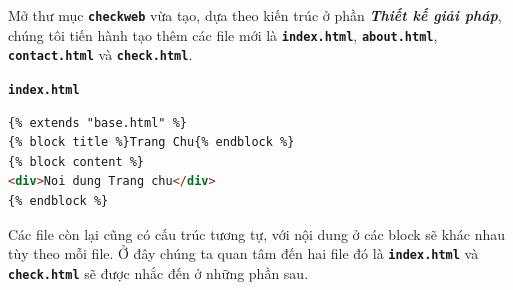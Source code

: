 \par
Mở thư mục \textbf{\texttt{checkweb}} vừa tạo, dựa theo kiến trúc ở phần \textbf{\textit{Thiết kế giải pháp}}, chúng tôi tiến hành tạo thêm các file mới là \textbf{\texttt{index.html}}, \textbf{\texttt{about.html}}, \textbf{\texttt{contact.html}} và \textbf{\texttt{check.html}}.
\par
\textbf{\texttt{index.html}}
\begin{lstlisting}[language=html]
{% extends "base.html" %}
{% block title %}Trang Chu{% endblock %}
{% block content %}
<div>Noi dung Trang chu</div>
{% endblock %}
\end{lstlisting}
\par
Các file còn lại cũng có cấu trúc tương tự, với nội dung ở các block sẽ khác nhau tùy theo mỗi file. Ở đây chúng ta quan tâm đến hai file đó là \textbf{\texttt{index.html}} và \textbf{\texttt{check.html}} sẽ được nhắc đến ở những phần sau.
